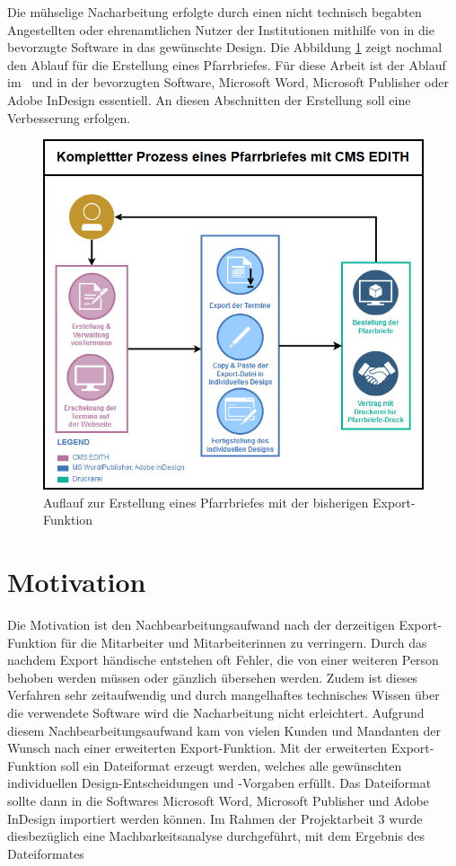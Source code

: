 \abschnitt
Die mühselige Nacharbeitung erfolgte durch einen nicht technisch begabten Angestellten oder ehrenamtlichen Nutzer der Institutionen mithilfe von  in die bevorzugte Software in das gewünschte Design. Die Abbildung \ref{img:AblaufErstellungPfarrbrief} zeigt nochmal den Ablauf für die Erstellung eines Pfarrbriefes. Für diese Arbeit ist der Ablauf im \cmsEdith \, und in der bevorzugten Software, Microsoft Word, Microsoft Publisher oder Adobe InDesign essentiell. An diesen Abschnitten der Erstellung soll eine Verbesserung erfolgen.\abschnitt
\begin{figure}[h]
	\centering
	\includegraphics[width=13cm]{bilder/kompletterJetzigerProzess.png}
    \caption{Auflauf zur Erstellung eines Pfarrbriefes mit der bisherigen Export-Funktion}
    \label{img:AblaufErstellungPfarrbrief}
\end{figure} \abschnitt


\section{Motivation} \label{motivation}
Die Motivation ist den Nachbearbeitungsaufwand nach der derzeitigen Export-Funktion für die Mitarbeiter und Mitarbeiterinnen zu verringern. Durch das nachdem Export händische  entstehen oft Fehler, die von einer weiteren Person behoben werden müssen oder gänzlich übersehen werden. Zudem ist dieses Verfahren sehr zeitaufwendig und durch mangelhaftes technisches Wissen über die verwendete Software wird die Nacharbeitung nicht erleichtert. \abschnitt
Aufgrund diesem Nachbearbeitungsaufwand kam von vielen Kunden und Mandanten der Wunsch nach einer erweiterten Export-Funktion. Mit der erweiterten Export-Funktion soll ein Dateiformat erzeugt werden, welches alle gewünschten individuellen Design-Entscheidungen und -Vorgaben erfüllt. Das Dateiformat sollte dann in die Softwares Microsoft Word, Microsoft Publisher und Adobe InDesign importiert werden können. Im Rahmen der Projektarbeit 3 wurde diesbezüglich eine Machbarkeitsanalyse durchgeführt, mit dem Ergebnis des Dateiformates 


